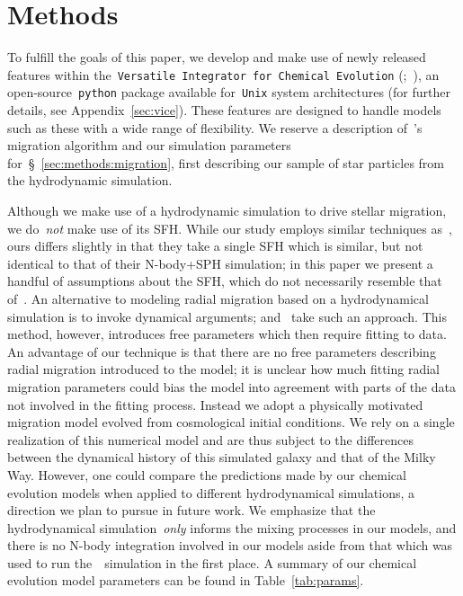 \documentclass[draft2.tex]{subfiles}
\begin{document}
 

\section{Methods} 
\label{sec:methods} 
To fulfill the goals of this paper, we develop and make use of newly released 
features within the~\texttt{Versatile Integrator for Chemical Evolution} 
(\vice;~\citealp{Johnson2020}), an open-source~\texttt{python} package 
available for~\texttt{Unix} system architectures (for further details, see 
Appendix~\ref{sec:vice}). 
These features are designed to handle models such as these with a wide range of 
flexibility. 
We reserve a description of~\vice's migration algorithm and our simulation 
parameters for~\S~\ref{sec:methods:migration}, first describing our sample of 
star particles from the hydrodynamic simulation. 
\par 
Although we make use of a hydrodynamic simulation to drive stellar migration, 
we do~\textit{not} make use of its SFH. 
While our study employs similar techniques as~\citet{Minchev2013}, ours differs 
slightly in that they take a single SFH which is similar, but not identical to 
that of their N-body+SPH simulation; in this paper we present a handful of 
assumptions about the SFH, which do not necessarily resemble that of~\hsim. 
An alternative to modeling radial migration based on a 
hydrodynamical simulation is to invoke dynamical arguments; 
\citet{Schoenrich2009a} and~\citet{Sharma2020} take such an approach. 
This method, however, introduces free parameters which then require fitting to 
data. 
An advantage of our technique is that there are no free parameters describing 
radial migration introduced to the model; it is unclear how much 
fitting radial migration parameters could bias the model into agreement with 
parts of the data not involved in the fitting process. 
Instead we adopt a physically motivated migration model evolved from 
cosmological initial conditions. 
We rely on a single realization of this numerical model and are thus subject to 
the differences between the dynamical history of this simulated galaxy and that 
of the Milky Way. 
However, one could compare the predictions made by our chemical evolution 
models when applied to different hydrodynamical simulations, a direction we 
plan to pursue in future work. 
We emphasize that the hydrodynamical simulation~\textit{only} informs the 
mixing processes in our models, and there is no N-body integration involved in 
our models aside from that which was used to run the~\hsim~simulation in the 
first place. 
{\color{red} 
A summary of our chemical evolution model parameters can be found in 
Table~\ref{tab:params}. 
} 
\end{document}
